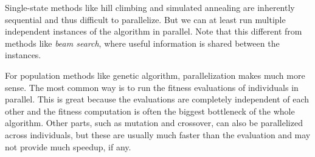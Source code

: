 Single-state methods like hill climbing and simulated annealing are inherently sequential and thus difficult to parallelize. But we can at least run multiple independent instances of the algorithm in parallel. Note that this different from methods like \textit{beam search}, where useful information is shared between the instances.

For population methods like genetic algorithm, parallelization makes much more sense. The most common way is to run the fitness evaluations of individuals in parallel. This is great because the evaluations are completely independent of each other and the fitness computation is often the biggest bottleneck of the whole algorithm. Other parts, such as mutation and crossover, can also be parallelized across individuals, but these are usually much faster than the evaluation and may not provide much speedup, if any.

% 
% 
